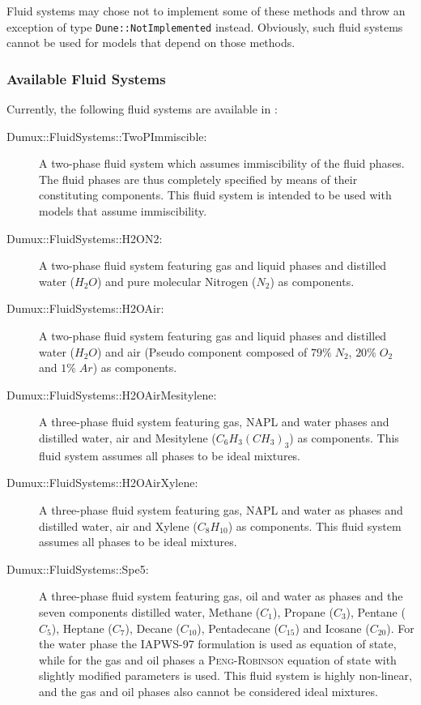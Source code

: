 Fluid systems may chose not to implement some of these methods and
throw an exception of type \lstinline{Dune::NotImplemented} instead. Obviously,
such fluid systems cannot be used for models that depend on those
methods.

\subsubsection{Available Fluid Systems}

Currently, the following fluid systems are available in \Dumux:
\begin{description}
\item[Dumux::FluidSystems::TwoPImmiscible:] A two-phase fluid system
  which assumes immiscibility of the fluid phases. The fluid phases
  are thus completely specified by means of their constituting
  components. This fluid system is intended to be used with models
  that assume immiscibility.
\item[Dumux::FluidSystems::H2ON2:] A two-phase fluid system featuring
  gas and liquid phases and distilled water ($H_2O$) and pure
  molecular Nitrogen ($N_2$) as components.
\item[Dumux::FluidSystems::H2OAir:] A two-phase fluid system
  featuring gas and liquid phases and distilled water ($H_2O$) and
  air (Pseudo component composed of $79\%\;N_2$, $20\%\;O_2$ and
  $1\%\;Ar$) as components.
\item[Dumux::FluidSystems::H2OAirMesitylene:] A three-phase fluid
  system featuring gas, NAPL and water phases and distilled water, air
  and Mesitylene ($C_6H_3(CH_3)_3$) as components. This fluid system
  assumes all phases to be ideal mixtures.
\item[Dumux::FluidSystems::H2OAirXylene:] A three-phase fluid system
  featuring gas, NAPL and water as phases and distilled water, air and
  Xylene ($C_8H_{10}$) as components. This fluid system assumes all
  phases to be ideal mixtures.
\item[Dumux::FluidSystems::Spe5:] A three-phase fluid system featuring
  gas, oil and water as phases and the seven components distilled
  water, Methane ($C_1$), Propane ($C_3$), Pentane ($C_5$), Heptane
  ($C_7$), Decane ($C_{10}$), Pentadecane ($C_{15}$) and Icosane
  ($C_{20}$). For the water phase the IAPWS-97 formulation is used as
  equation of state, while for the gas and oil phases a
  \textsc{Peng}-\textsc{Robinson} equation of state with slightly
  modified parameters is used. This fluid system is highly non-linear,
  and the gas and oil phases also cannot be considered ideal
  mixtures\cite{SPE5}.
\end{description}

